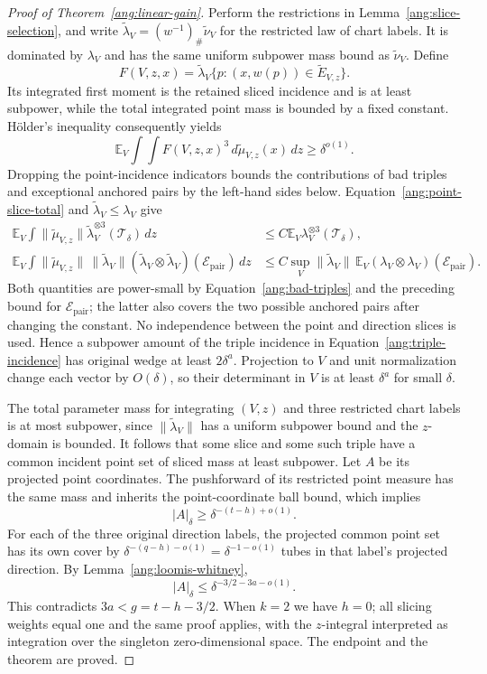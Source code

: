 \documentclass[11pt,reqno]{amsart}
\begin{document}
\begin{proof}[Proof of Theorem~\ref{ang:linear-gain}]
Perform the restrictions in Lemma~\ref{ang:slice-selection}, and
write $\widetilde\lambda_V=(w^{-1})_\#\widetilde\nu_V$ for the restricted
law of chart labels. It is dominated by $\lambda_V$ and has the same
uniform subpower mass bound as $\widetilde\nu_V$. Define
\[
 F(V,z,x)=\widetilde\lambda_V
 \{p:(x,w(p))\in\widetilde E_{V,z}\}.
\]
Its integrated first moment is the retained sliced incidence and is at
least subpower, while the total integrated point mass is bounded by a
fixed constant.
H\"older's inequality consequently yields
\begin{equation}\label{ang:triple-incidence}
 \mathbb E_V\int\int F(V,z,x)^3
                 \,d\widetilde\mu_{V,z}(x)\,dz
       \ge\delta^{o(1)}.
\end{equation}
Dropping the point-incidence indicators bounds the contributions of
bad triples and exceptional anchored pairs by the left-hand sides below.
Equation~\eqref{ang:point-slice-total} and
$\widetilde\lambda_V\le\lambda_V$ give
\begin{align*}
 \mathbb E_V\int \|\widetilde\mu_{V,z}\|
      \widetilde\lambda_V^{\otimes3}(\mathcal T_\delta)\,dz
 &\le C\mathbb E_V\lambda_V^{\otimes3}(\mathcal T_\delta),\\
 \mathbb E_V\int \|\widetilde\mu_{V,z}\|\,\|\widetilde\lambda_V\|
      (\widetilde\lambda_V\otimes\widetilde\lambda_V)
          (\mathcal E_{\mathrm{pair}})\,dz
 &\le C\sup_V\|\widetilde\lambda_V\|\,
      \mathbb E_V(\lambda_V\otimes\lambda_V)
          (\mathcal E_{\mathrm{pair}}).
\end{align*}
Both quantities are power-small by Equation~\eqref{ang:bad-triples}
and the preceding bound for $\mathcal E_{\mathrm{pair}}$; the latter
also covers the two possible anchored pairs after changing the constant. No independence
between the point and direction slices is used. Hence a
subpower amount of the triple incidence in
Equation~\eqref{ang:triple-incidence} has original wedge at least
$2\delta^a$. Projection to $V$ and unit normalization change each
vector by $O(\delta)$, so their determinant in $V$ is at least
$\delta^a$ for small $\delta$.

The total parameter mass for integrating $(V,z)$ and three restricted
chart labels is at most subpower, since $\|\widetilde\lambda_V\|$ has a
uniform subpower bound and the $z$-domain is bounded.
It follows that some slice and some such triple have a common
incident point set of sliced mass at least subpower. Let $A$ be its
projected point coordinates. The pushforward of its restricted point
measure has the same mass and inherits the point-coordinate ball bound,
which implies
\[
 |A|_\delta\ge\delta^{-(t-h)+o(1)}.
\]
For each of the three original direction labels, the projected common
point set has its own cover by
$\delta^{-(q-h)-o(1)}=\delta^{-1-o(1)}$ tubes in that label's projected
direction. By
Lemma~\ref{ang:loomis-whitney},
\[
 |A|_\delta\le\delta^{-3/2-3a-o(1)}.
\]
This contradicts $3a<g=t-h-3/2$. When $k=2$ we have $h=0$;
all slicing weights equal one and the same proof applies, with the
$z$-integral interpreted as integration over the singleton
zero-dimensional space. The endpoint and the theorem are proved.
\end{proof}
\end{document}
